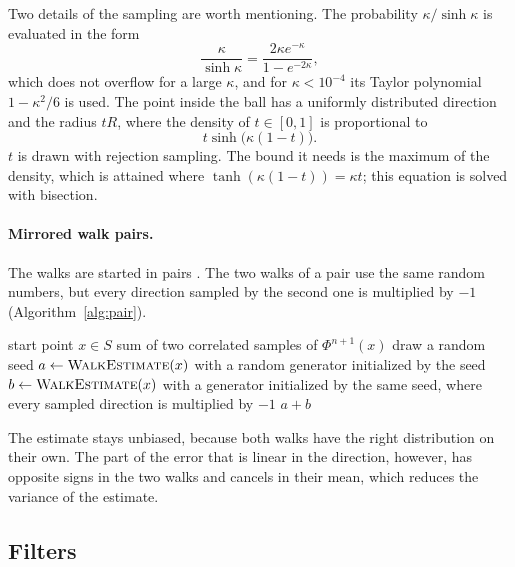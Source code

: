\documentclass[
]{elteiktdk}[2024/04/26]
\begin{document}
	Two details of the sampling are worth mentioning. The probability $\kappa / \sinh \kappa$ is evaluated in the form
	\[
	\frac{\kappa}{\sinh \kappa} = \frac{2 \kappa e^{-\kappa}}{1 - e^{-2\kappa}},
	\]
	which does not overflow for a large $\kappa$, and for $\kappa < 10^{-4}$ its Taylor polynomial $1 - \kappa^2 / 6$ is used. The point inside the ball has a uniformly distributed direction and the radius $tR$, where the density of $t \in [0, 1]$ is proportional to
	\[
	t \sinh\bigl(\kappa (1 - t)\bigr).
	\]
	$t$ is drawn with rejection sampling. The bound it needs is the maximum of the density, which is attained where $\tanh(\kappa (1 - t)) = \kappa t$; this equation is solved with bisection.
	
	\paragraph{Mirrored walk pairs.} The walks are started in pairs \cite{Hammersley_Morton_1956}. The two walks of a pair use the same random numbers, but every direction sampled by the second one is multiplied by $-1$ (Algorithm~\ref{alg:pair}).
	
	\begin{algorithm}[ht]
		\small
		\caption[Mirrored walk pair]{A mirrored pair of walks started from the vertex $x$.}
		\label{alg:pair}
		\begin{algorithmic}[1]
			\Require start point $x \in S$
			\Ensure sum of two correlated samples of $\Phi^{n+1}(x)$
			\State draw a random seed
			\State $a \gets \textsc{WalkEstimate}(x)$ with a random generator initialized by the seed
			\State $b \gets \textsc{WalkEstimate}(x)$ with a generator initialized by the same seed, where every sampled direction is multiplied by $-1$
			\State \Return $a + b$
		\end{algorithmic}
	\end{algorithm}
	The estimate stays unbiased, because both walks have the right distribution on their own. The part of the error that is linear in the direction, however, has opposite signs in the two walks and cancels in their mean, which reduces the variance of the estimate.
	
	\subsection{Filters}
	
\end{document}
